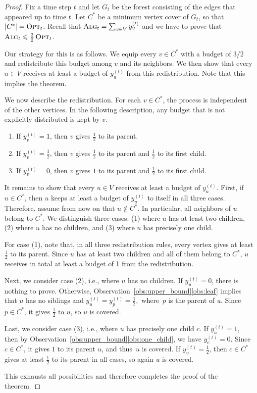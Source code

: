 \documentclass[a4paper,USenglish,cleveref,autoref,thm-restate,pdfa]{lipics-v2021}
\let\leq\leqslant
\newcommand{\alg}{\textsc{Alg}\xspace}
\newcommand{\opt}{\textsc{Opt}\xspace}
\begin{document}
\begin{proof}
Fix a time step $t$ and let $G_t$ be the forest consisting of the edges that appeared up to time $t$.
Let $C^*$ be a minimum vertex cover of $G_t$, so that $|C^*|=\opt_t$.
Recall that
$
\alg_t = \sum_{v\in V} y_v^{(t)}
$
and we have to prove that $\alg_t \leq \frac{3}{2} \, \opt_t$.

Our strategy for this is as follows. We equip every $v\in C^*$ with a budget of $3/2$ and redistribute this budget among $v$ and its neighbors. We then show that every $u\in V$ receives at least a budget of $y_u^{(t)}$ from this redistribution. Note that this implies the theorem.

We now describe the redistribution. For each $v\in C^*$, the process is independent of the other vertices. In the following description, any budget that is not explicitly distributed is kept by $v$.
\begin{enumerate}
    \item If $y_v^{(t)}=1$, then $v$ gives $\frac12$ to its parent.
    \item If $y_v^{(t)}=\frac12$, then $v$ gives $\frac12$ to its parent and $\frac12$ to its first child.
    \item If $y_v^{(t)}=0$, then $v$ gives $1$ to its parent and $\frac12$ to its first child.
\end{enumerate}

It remains to show that every $u\in V$ receives at least a budget of $y_u^{(t)}$.
First, if $u\in C^*$, then $u$ keeps at least a budget of $y_u^{(t)}$ to itself in all three cases.
Therefore, assume from now on that $u\notin C^*$. In particular, all neighbors of $u$ belong to $C^*$.
We distinguish three cases: (1) where $u$ has at least two children, (2) where $u$ has no children, and (3) where $u$ has precisely one child.

For case (1), note that, in all three redistribution rules, every vertex gives at least $\frac12$ to its parent.
Since $u$ has at least two children and all of them belong to $C^*$, $u$ receives in total at least a budget of 1 from the redistribution.

Next, we consider case (2), i.e., where $u$ has no children.
If $y_u^{(t)}=0$, there is nothing to prove. Otherwise, Observation~\ref{obs:upper_bound}\ref{obs:leaf} implies that $u$ has no siblings and
$
y_u^{(t)}=y_p^{(t)}=\frac12,
$
where~$p$ is the parent of $u$. Since $p\in C^*$, it gives $\frac12$ to $u$, so $u$ is covered.

Last, we consider case (3), i.e., where $u$ has precisely one child $c$.
If $y_u^{(t)}=1$, then by Observation~\ref{obs:upper_bound}\ref{obs:one_child}, we have $y_c^{(t)}=0$. Since $c\in C^*$, it gives $1$ to its parent $u$, and thus~$u$ is covered.
If $y_u^{(t)}=\frac12$, then $c\in C^*$ gives at least $\frac12$ to its parent in all cases, so again $u$ is covered.

This exhausts all possibilities and therefore completes the proof of the theorem.
\end{proof}
\end{document}
